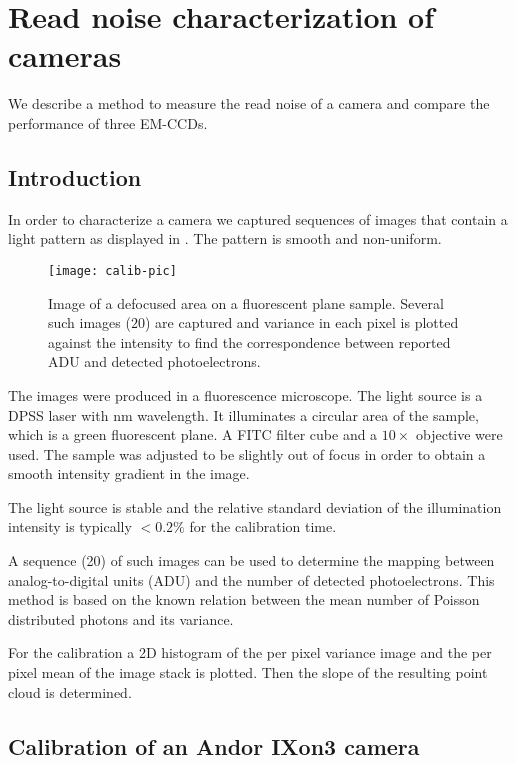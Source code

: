 \chapter{Read noise characterization of cameras}
\label{sec:ccd-meas}
\begin{summary}
  We describe a method to measure the read noise of a camera and
  compare the performance of three EM-CCDs.
\end{summary}
\section{Introduction}
In order to characterize a camera we captured sequences of images that
contain a light pattern as displayed in . The
pattern is smooth and non-uniform.
\begin{figure}[!hbt]
  \centering
  \texttt{[image: calib-pic]}
  \caption{Image of a defocused area on a fluorescent plane
    sample. Several such images ($20$) are captured and variance in
    each pixel is plotted against the intensity to find the
    correspondence between reported ADU and detected photoelectrons.}
  \label{fig:calib-pic}
\end{figure}
The images were produced in a fluorescence microscope. The light
source is a DPSS laser with \unit[473]{nm} wavelength. It illuminates
a circular area of the sample, which is a green fluorescent plane. A
FITC filter cube and a $10\times$ objective were used. The sample was
adjusted to be slightly out of focus in order to obtain a smooth
intensity gradient in the image.

The light source is stable and the relative standard deviation of the
illumination intensity is typically $<0.2\%$ for the calibration
time. 

A sequence (20) of such images can be used to determine the mapping
between analog-to-digital units (ADU)
 and the number of detected
photoelectrons. This method is based on the known relation between the
mean number of Poisson distributed photons and its variance.

For the calibration a 2D histogram of the per pixel
variance image and the per pixel mean of the image stack is
plotted. Then the slope of the resulting point cloud is determined.

\section{Calibration of an Andor IXon3 camera}

